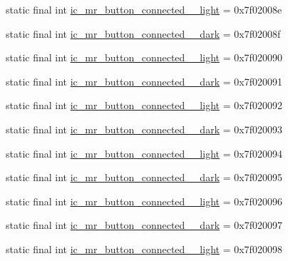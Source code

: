 \begin{CompactItemize}
\item 
static final int \hyperlink{classandroid_1_1support_1_1graphics_1_1drawable_1_1_r_1_1drawable_4882ca437d616d7d3ea1177a4af67b56}{ic\_\-mr\_\-button\_\-connected\_\_\-light} = 0x7f02008e
\item 
static final int \hyperlink{classandroid_1_1support_1_1graphics_1_1drawable_1_1_r_1_1drawable_b86d56e1a2cd56ebe3dd3ef9f66c62cd}{ic\_\-mr\_\-button\_\-connected\_\_\-dark} = 0x7f02008f
\item 
static final int \hyperlink{classandroid_1_1support_1_1graphics_1_1drawable_1_1_r_1_1drawable_ea485e2af0720dffe0b1e0fcab54719d}{ic\_\-mr\_\-button\_\-connected\_\_\-light} = 0x7f020090
\item 
static final int \hyperlink{classandroid_1_1support_1_1graphics_1_1drawable_1_1_r_1_1drawable_589b726764bd4a75c02fce88a528414e}{ic\_\-mr\_\-button\_\-connected\_\_\-dark} = 0x7f020091
\item 
static final int \hyperlink{classandroid_1_1support_1_1graphics_1_1drawable_1_1_r_1_1drawable_3264b5c420b4c1818808f11c0ca2e7e4}{ic\_\-mr\_\-button\_\-connected\_\_\-light} = 0x7f020092
\item 
static final int \hyperlink{classandroid_1_1support_1_1graphics_1_1drawable_1_1_r_1_1drawable_76acf17f5a5d5ee6fab7c889b39ca9dc}{ic\_\-mr\_\-button\_\-connected\_\_\-dark} = 0x7f020093
\item 
static final int \hyperlink{classandroid_1_1support_1_1graphics_1_1drawable_1_1_r_1_1drawable_e9f8eb571d3f499a275148cf88819ec3}{ic\_\-mr\_\-button\_\-connected\_\_\-light} = 0x7f020094
\item 
static final int \hyperlink{classandroid_1_1support_1_1graphics_1_1drawable_1_1_r_1_1drawable_f4bdb6be5185f78628277f6e15913016}{ic\_\-mr\_\-button\_\-connected\_\_\-dark} = 0x7f020095
\item 
static final int \hyperlink{classandroid_1_1support_1_1graphics_1_1drawable_1_1_r_1_1drawable_54a07996465050178986ae7c2cd41e3a}{ic\_\-mr\_\-button\_\-connected\_\_\-light} = 0x7f020096
\item 
static final int \hyperlink{classandroid_1_1support_1_1graphics_1_1drawable_1_1_r_1_1drawable_f6082f96702af9353e73582c5001d999}{ic\_\-mr\_\-button\_\-connected\_\_\-dark} = 0x7f020097
\item 
static final int \hyperlink{classandroid_1_1support_1_1graphics_1_1drawable_1_1_r_1_1drawable_da82fca082cffb8ef4fcc2ea7986720c}{ic\_\-mr\_\-button\_\-connected\_\_\-light} = 0x7f020098
\item 

\end{CompactItemize}
